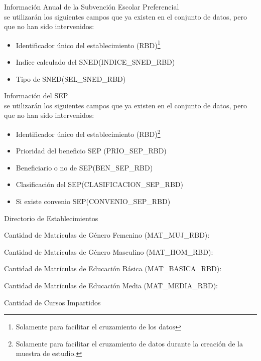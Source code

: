 \begin{longdescription}
        \item[Información Anual de la Subvención Escolar Preferencial] \hfill \\
         se utilizarán los siguientes campos que ya existen en el conjunto de datos, pero que no han sido intervenidos:
            \begin{itemize}
                \item Identificador único del establecimiento (RBD)\footnote{Solamente para facilitar el cruzamiento de los datos}
                \item Indice calculado del SNED(INDICE\_SNED\_RBD)
                \item Tipo de SNED(SEL\_SNED\_RBD)
            \end{itemize}
        \item[Información del SEP] \hfill \\
        se utilizarán los siguientes campos que ya existen en el conjunto de datos, pero que no han sido intervenidos:
            \begin{itemize}
              \item Identificador único del establecimiento (RBD)\footnote{Solamente para facilitar el cruzamiento de datos durante la creación de la muestra de estudio.}
              \item Prioridad del beneficio SEP (PRIO\_SEP\_RBD)
              \item Beneficiario o no de SEP(BEN\_SEP\_RBD)
              \item Clasificación del SEP(CLASIFICACION\_SEP\_RBD)
              \item Si existe convenio SEP(CONVENIO\_SEP\_RBD)
            \end{itemize}
        \item[Directorio de Establecimientos] \hfill \\
            \begin{longdescription}
                \item[Cantidad de Matrículas de Género Femenino](MAT\_MUJ\_RBD):
                \item[Cantidad de Matrículas de Género Masculino](MAT\_HOM\_RBD):
                \item[Cantidad de Matrículas de Educación Básica](MAT\_BASICA\_RBD):
                \item[Cantidad de Matrículas de Educación Media]
                (MAT\_MEDIA\_RBD):
                \item[Cantidad de Cursos Impartidos]

\end{longdescription}
\end{longdescription}

